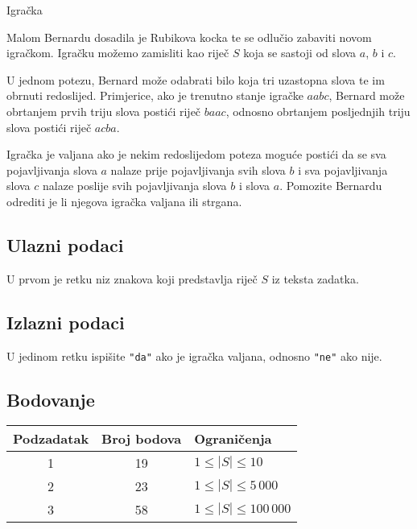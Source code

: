 \begin{statement}[
  problempoints=100,
  timelimit=1 sekunda,
  memorylimit=512 MiB,
]{Igračka}

Malom Bernardu dosadila je Rubikova kocka te se odlučio zabaviti novom
igračkom. Igračku možemo zamisliti kao riječ $S$ koja se sastoji od slova $a$,
$b$ i $c$.

U jednom potezu, Bernard može odabrati bilo koja tri uzastopna slova te im
obrnuti redoslijed. Primjerice, ako je trenutno stanje igračke $aabc$,
Bernard može obrtanjem prvih triju slova postići riječ $baac$, odnosno
obrtanjem posljednjih triju slova postići riječ $acba$.

Igračka je valjana ako je nekim redoslijedom poteza moguće postići da se sva
pojavljivanja slova $a$ nalaze prije pojavljivanja svih slova $b$ i sva
pojavljivanja slova $c$ nalaze poslije svih pojavljivanja slova $b$ i slova
$a$. Pomozite Bernardu odrediti je li njegova igračka valjana ili strgana.

\subsection*{Ulazni podaci}

U prvom je retku niz znakova koji predstavlja riječ $S$ iz teksta zadatka.

\subsection*{Izlazni podaci}

U jedinom retku ispišite \texttt{"da"} ako je igračka valjana, odnosno \texttt{"ne"} ako nije.

\subsection*{Bodovanje}

{\renewcommand{\arraystretch}{1.4}
  \setlength{\tabcolsep}{6pt}
  \begin{tabular}{ccl}
   Podzadatak & Broj bodova & Ograničenja \\ \midrule
    1 & 19 & $1 \le |S| \le 10$\\
    2 & 23 & $1 \le |S| \le 5\,000$ \\
    3 & 58 & $1 \le |S| \le 100\,000$ \\
\end{tabular}}


\end{statement}
